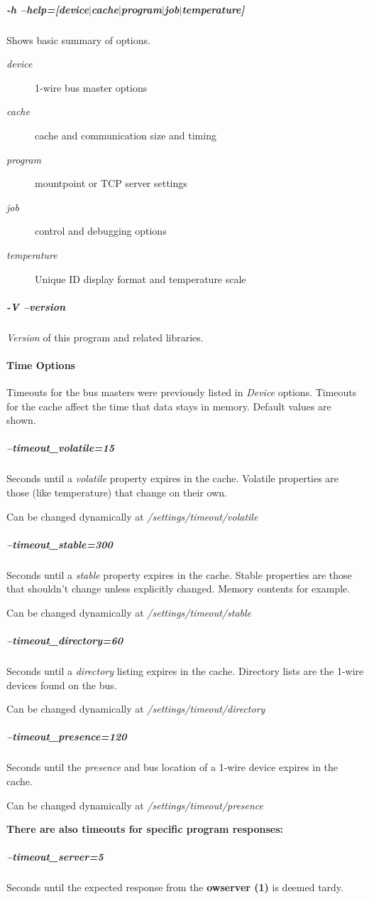 \subparagraph*{-h --help=[device$|$cache$|$program$|$job$|$temperature]}Shows basic summary of options.
\begin{description}
\item [\textit{device} ] 1-wire bus master options 
\item [\textit{cache} ] cache and communication size and
timing 
\item [\textit{program} ] mountpoint or TCP server settings 
\item [\textit{job} ] control and debugging
options 
\item [\textit{temperature} ] Unique ID display format and temperature scale 
\end{description}

\subparagraph*{-V --version}\textit{Version}
of this program and related libraries.            
\paragraph*{Time Options}
Timeouts for
the bus masters were previously listed in \textit{Device} options. Timeouts for the
cache affect the time that data stays in memory. Default values are shown.

\subparagraph*{--timeout\_volatile=15}Seconds until a  \textit{volatile}  property expires in the cache.
Volatile properties are those (like temperature) that change on their own.


Can be changed dynamically at  \textit{/settings/timeout/volatile} 
\subparagraph*{--timeout\_stable=300}Seconds
until a  \textit{stable}  property expires in the cache. Stable properties are those
that shouldn't change unless explicitly changed. Memory contents for example.


Can be changed dynamically at  \textit{/settings/timeout/stable} 
\subparagraph*{--timeout\_directory=60}Seconds
until a  \textit{directory}  listing expires in the cache. Directory lists are the
1-wire devices found on the bus. 

Can be changed dynamically at  \textit{/settings/timeout/directory}

\subparagraph*{--timeout\_presence=120}Seconds until the \textit{presence} and bus location of a 1-wire
device expires in the cache. 

Can be changed dynamically at  \textit{/settings/timeout/presence}


\textbf{There are also timeouts for specific program responses:} 
\subparagraph*{--timeout\_server=5}Seconds
until the expected response from the \textsf{\textbf{owserver (1)}} is deemed tardy. 

